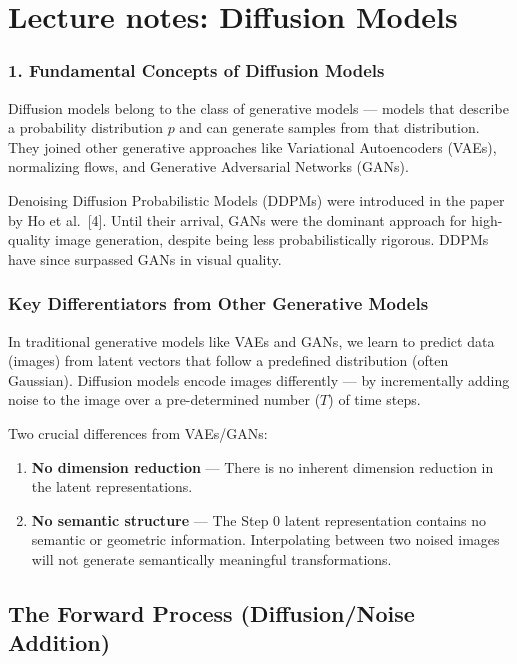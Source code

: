 \chapter{\normalsize Lecture notes: Diffusion Models}


\subsection*{1. Fundamental Concepts of Diffusion Models}

Diffusion models belong to the class of generative models --- models that describe a probability distribution $p$ and can generate samples from that distribution. They joined other generative approaches like Variational Autoencoders (VAEs), normalizing flows, and Generative Adversarial Networks (GANs).

Denoising Diffusion Probabilistic Models (DDPMs) were introduced in the paper by Ho et al.~[4]. Until their arrival, GANs were the dominant approach for high-quality image generation, despite being less probabilistically rigorous. DDPMs have since surpassed GANs in visual quality.

\subsection*{Key Differentiators from Other Generative Models}

In traditional generative models like VAEs and GANs, we learn to predict data (images) from latent vectors that follow a predefined distribution (often Gaussian). Diffusion models encode images differently --- by incrementally adding noise to the image over a pre-determined number ($T$) of time steps.

Two crucial differences from VAEs/GANs:
\begin{enumerate}
    \item \textbf{No dimension reduction} --- There is no inherent dimension reduction in the latent representations.
    \item \textbf{No semantic structure} --- The Step 0 latent representation contains no semantic or geometric information. Interpolating between two noised images will not generate semantically meaningful transformations.
\end{enumerate}

\section{The Forward Process (Diffusion/Noise Addition)}

